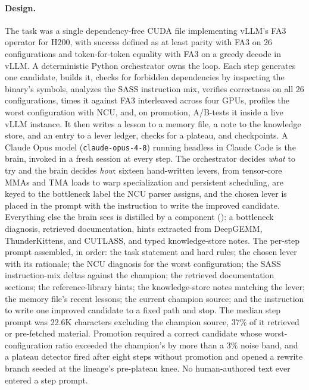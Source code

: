 \paragraph{Design.} The task was a single dependency-free CUDA file implementing vLLM's FA3 operator
for H200, with success defined as at least parity with FA3 on 26 configurations and token-for-token
equality with FA3 on a greedy decode in vLLM. A deterministic Python orchestrator owns the loop. Each
step generates one candidate, builds it, checks for forbidden dependencies by inspecting the binary's
symbols, analyzes the SASS instruction mix, verifies correctness on all 26 configurations, times it
against FA3 interleaved across four GPUs, profiles the worst configuration with NCU, and, on
promotion, A/B-tests it inside a live vLLM instance. It then writes a lesson to a memory file, a note
to the knowledge store, and an entry to a lever ledger, checks for a plateau, and checkpoints. A
Claude Opus model (\texttt{claude-opus-4-8}) running headless in Claude Code is the brain, invoked in
a fresh session at every step. The orchestrator decides \emph{what} to try and the brain decides
\emph{how}: sixteen hand-written levers, from tensor-core MMAs and TMA
loads to warp specialization and persistent scheduling, are keyed to the bottleneck label the NCU parser assigns, and the
chosen lever is placed in the prompt with the instruction to write the improved candidate. Everything
else the brain sees is distilled by a component (): a bottleneck
diagnosis, retrieved documentation, hints extracted from DeepGEMM, ThunderKittens, and CUTLASS, and
typed knowledge-store notes. The per-step prompt assembled, in order: the task statement and hard
rules; the chosen lever with its rationale; the NCU diagnosis for the worst configuration; the SASS
instruction-mix deltas against the champion; the retrieved documentation sections; the
reference-library hints; the knowledge-store notes matching the lever; the memory file's recent
lessons; the current champion source; and the instruction to write one improved candidate to a
fixed path and stop. The median step prompt was 22.6K characters excluding the champion source,
37\% of it retrieved or pre-fetched material. Promotion required a correct candidate whose
worst-configuration ratio exceeded the champion's by more than a 3\% noise band, and a plateau
detector fired after eight steps without promotion and opened a rewrite branch seeded at the
lineage's pre-plateau knee. No human-authored text ever entered a step prompt.

